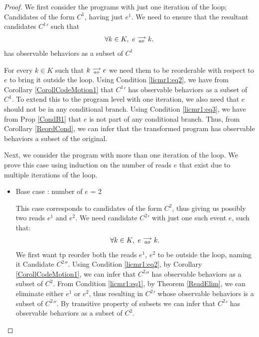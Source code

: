 \begin{proof}

    We first consider the programs with just one iteration of the loop; Candidates of the form $C^1$, having just $e^1$. 
    We need to ensure that the resultant candidates $C^{1}'$ such that 
    \begin{align*}
        \forall k \in K, \ e\stackrel{\longrightarrow}{_{ao}}k.
    \end{align*}  
    has observable behaviors as a subset of $C^1$

    For every $k \in K$ such that $k\stackrel{\longrightarrow}{_{ao}}e$ we need them to be reorderable with respect to $e$ to bring it outside the loop.
    Using Condition \ref{licmr1:eq2}, we have from Corollary \ref{CorollCodeMotion1} that $C^{1}'$ has observable behaviors as a subset of $C^1$.
    To extend this to the program level with one iteration, we also need that $e$ should not be in any conditional branch.
    Using Condition \ref{licmr1:eq3}, we have from Prop \ref{CondB1} that $e$ is not part of any conditional branch.
    Thus, from Corollary \ref{ReordCond}, we can infer that the transformed program has observable behaviors a subset of the original.  
    
    Next, we consider the program with more than one iteration of the loop. 
    We prove this case using induction on the number of reads $e$ that exist due to multiple iterations of the loop. 
    \begin{itemize}

        \item Base case : number of $e$ = 2
    
        This case corresponds to candidates of the form $C^2$, thus giving us possibly two reads $e^1$ and $e^2$.
        We need candidate $C^2'$ with just one such event $e$, such that:
        \begin{align*}
            \forall k \in K, \ e\stackrel{\longrightarrow}{_{ao}}k.
        \end{align*}
        We first want tp reorder both the reads $e^1$, $e^2$ to be outside the loop, naming it Candidate $C^{2}''$.
        Using Condition \ref{licmr1:eq2}, by Corollary \ref{CorollCodeMotion1}, we can infer that $C^{2}''$ has observable behaviors as a subset of $C^2$. 
        From Condition \ref{licmr1:eq1}, by Theorem \ref{ReadElim}, we can eliminate either $e^1$ or $e^2$, thus resulting in $C^2'$ whose observable behaviors is a subset of $C^{2}''$.
        By transitive property of subsets we can infer that $C^2'$ has observable behaviors as a subset of $C^2$.
        

\end{itemize}
\end{proof}
